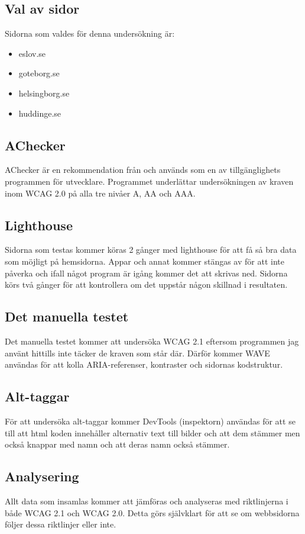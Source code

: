 \documentclass[11p]{article}
\begin{document}
\subsection{Val av sidor}
Sidorna som valdes för denna undersökning är:

\begin{itemize}
    \item eslov.se
    \item goteborg.se
    \item helsingborg.se
    \item huddinge.se
\end{itemize}

\subsection{AChecker}
AChecker är en rekommendation från \textcite{W3C} och används som en av tillgänglighets programmen för utvecklare.
Programmet underlättar undersökningen av kraven inom WCAG 2.0 på alla tre nivåer A, AA och AAA.

\subsection{Lighthouse}
Sidorna som testas kommer köras 2 gånger med lighthouse för att få så bra data som möjligt på hemsidorna.
Appar och annat kommer stängas av för att inte påverka och ifall något program är igång kommer det att skrivas ned.
Sidorna körs två gånger för att kontrollera om det uppstår någon skillnad i resultaten.

\subsection{Det manuella testet}
Det manuella testet kommer att undersöka WCAG 2.1 eftersom programmen jag använt hittills inte täcker de kraven som står där.
Därför kommer WAVE användas för att kolla ARIA-referenser, kontraster och sidornas kodstruktur.

\subsection{Alt-taggar}
För att undersöka alt-taggar kommer DevTools (inspektorn) användas för att se till att html koden innehåller alternativ text till bilder och att dem stämmer men också knappar med namn och att deras namn också stämmer.

\subsection{Analysering}

Allt data som insamlas kommer att jämföras och analyseras med riktlinjerna i både WCAG 2.1 och WCAG 2.0.
Detta görs självklart för att se om webbsidorna följer dessa riktlinjer eller inte.

\printbibliography
\end{document}
